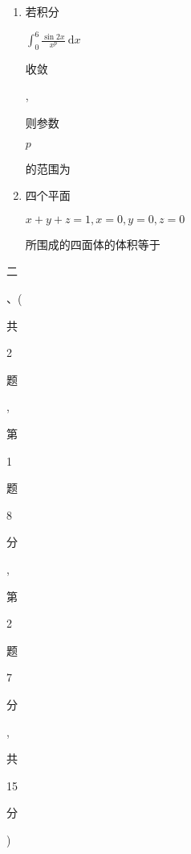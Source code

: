 \documentclass[10pt]{article}
\begin{document}
\begin{enumerate}
  \item \begin{CJK}{UTF8}{mj}若积分\end{CJK} $\int_{0}^{6} \frac{\sin 2 x}{x^{p}} \mathrm{~d} x$ \begin{CJK}{UTF8}{mj}收敛\end{CJK}, \begin{CJK}{UTF8}{mj}则参数\end{CJK} $p$ \begin{CJK}{UTF8}{mj}的范围为\end{CJK}

  \item \begin{CJK}{UTF8}{mj}四个平面\end{CJK} $x+y+z=1, x=0, y=0, z=0$ \begin{CJK}{UTF8}{mj}所围成的四面体的体积等于\end{CJK}

\end{enumerate}
\begin{CJK}{UTF8}{mj}二\end{CJK}、(\begin{CJK}{UTF8}{mj}共\end{CJK} 2 \begin{CJK}{UTF8}{mj}题\end{CJK}, \begin{CJK}{UTF8}{mj}第\end{CJK} 1 \begin{CJK}{UTF8}{mj}题\end{CJK} 8 \begin{CJK}{UTF8}{mj}分\end{CJK}, \begin{CJK}{UTF8}{mj}第\end{CJK} 2 \begin{CJK}{UTF8}{mj}题\end{CJK} 7 \begin{CJK}{UTF8}{mj}分\end{CJK}, \begin{CJK}{UTF8}{mj}共\end{CJK} 15 \begin{CJK}{UTF8}{mj}分\end{CJK})
\end{document}
